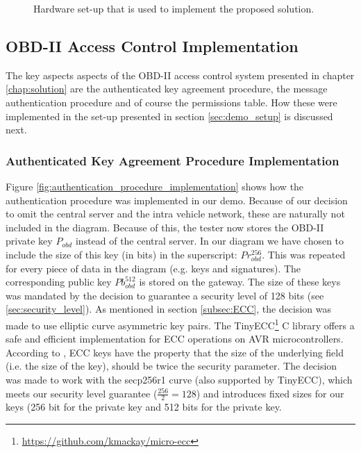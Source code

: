 \begin{figure}[h]
	\label{fig:demo}
	\caption{Hardware set-up that is used to implement the proposed solution.}
\end{figure}

\subsection{OBD-II Access Control Implementation}
The key aspects aspects of the OBD-II access control system presented in chapter \ref{chap:solution} are the authenticated key agreement procedure, the message authentication procedure and of course the permissions table. How these were implemented in the set-up presented in section \ref{sec:demo_setup} is discussed next. 

\subsubsection{Authenticated Key Agreement Procedure Implementation}
\label{subsec:authenticated_key_agreement_procedure_implementation}

Figure \ref{fig:authentication_procedure_implementation} shows how the authentication procedure was implemented in our demo. Because of our decision to omit the central server and the intra vehicle network, these are naturally not included in the diagram. Because of this, the tester now stores the OBD-II private key $P_{obd}$ instead of the central server. In our diagram we have chosen to include the size of this key (in bits) in the superscript: $Pr_{obd}^{256}$. This was repeated for every piece of data in the diagram (e.g. keys and signatures). The corresponding public key $Pb_{obd}^{512}$ is stored on the gateway. The size of these keys was mandated by the decision to guarantee a security level of 128 bits (see \ref{sec:security_level}). As mentioned in section \ref{subsec:ECC}, the decision was made to use elliptic curve asymmetric key pairs. The TinyECC\footnote{\url{https://github.com/kmackay/micro-ecc}} C library offers a safe and efficient implementation for ECC operations on AVR microcontrollers. According to \cite{wiki:ECC}, ECC keys have the property that the size of the underlying field (i.e. the size of the key), should be twice the security parameter. The decision was made to work with the secp256r1 curve (also supported by TinyECC), which meets our security level guarantee ($\frac{256}{2}=128$) and introduces fixed sizes for our keys (256 bit for the private key and 512 bits for the private key.

